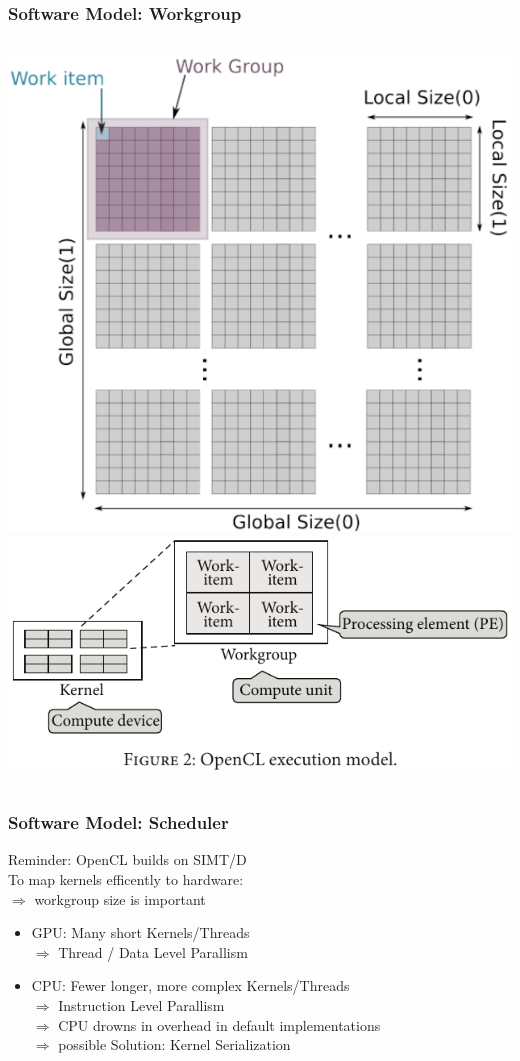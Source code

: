 \documentclass{beamer}
\begin{document}
\begin{frame}
    \frametitle{Software Model: Workgroup}
    \begin{columns}
            \includegraphics[width=\textwidth]{res/2DDataParallelWorkgroup.png}  
            \includegraphics[width=\textwidth]{res/ExecutionModel.png}   
    \end{columns}
\end{frame}
\begin{frame}
    \frametitle{Software Model: Scheduler}
    Reminder: OpenCL builds on SIMT/D\\
    To map kernels efficently to hardware:\\
    $\Rightarrow$ workgroup size is important
    \begin{itemize}
        \item GPU: Many short Kernels/Threads\\
             $\Rightarrow$ Thread / Data Level Parallism
        \item CPU: Fewer longer, more complex Kernels/Threads\\
             $\Rightarrow$ Instruction Level Parallism\\
             $\Rightarrow$ CPU drowns in overhead in default implementations\\
             $\Rightarrow$ possible Solution: Kernel Serialization
    \end{itemize}
\end{frame}
\end{document}
